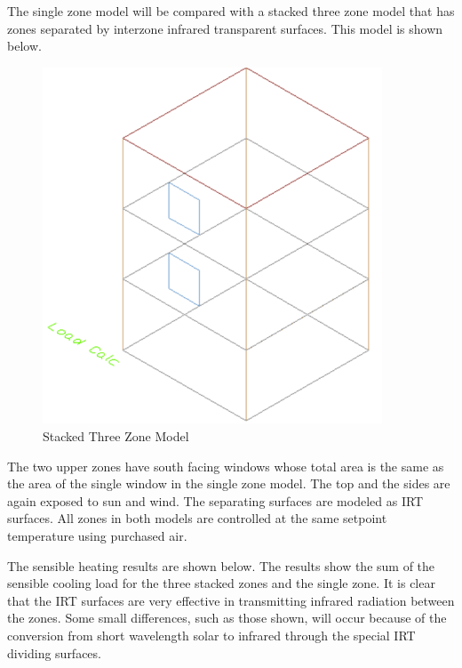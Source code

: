 The single zone model will be compared with a stacked three zone model that has zones separated by interzone infrared transparent surfaces. This model is shown below.

\begin{figure}[hbtp] %
\centering
\includegraphics[width=0.9\textwidth, height=0.9\textheight, keepaspectratio=true]{media/image397.png}
\caption{Stacked Three Zone Model \protect \label{fig:stacked-three-zone-model}}
\end{figure}

The two upper zones have south facing windows whose total area is the same as the area of the single window in the single zone model. The top and the sides are again exposed to sun and wind. The separating surfaces are modeled as IRT surfaces. All zones in both models are controlled at the same setpoint temperature using purchased air.

The sensible heating results are shown below. The results show the sum of the sensible cooling load for the three stacked zones and the single zone. It is clear that the IRT surfaces are very effective in transmitting infrared radiation between the zones. Some small differences, such as those shown, will occur because of the conversion from short wavelength solar to infrared through the special IRT dividing surfaces.


